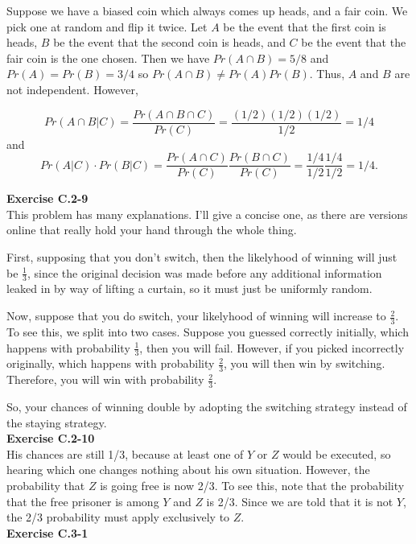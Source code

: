 \documentclass{article}
\begin{document}
Suppose we have a biased coin which always comes up heads, and a fair coin.  We pick one at random and flip it twice.  Let $A$ be the event that the first coin is heads, $B$ be the event that the second coin is heads, and $C$ be the event that the fair coin is the one chosen.  Then we have $Pr(A \cap B) = 5/8$ and $Pr(A) = Pr(B) = 3/4$ so $Pr(A \cap B) \neq Pr(A)Pr(B)$.  Thus, $A$ and $B$ are not independent.  However, 

\[ Pr(A \cap B | C) = \frac{Pr(A \cap B \cap C)}{Pr(C)} = \frac{(1/2)(1/2)(1/2)}{1/2} = 1/4\]
and
\[ Pr(A|C)\cdot Pr(B|C) = \frac{Pr(A \cap C)}{Pr(C)} \frac{Pr(B \cap C)}{Pr(C)} = \frac{1/4}{1/2} \frac{1/4}{1/2} = 1/4.\]

\noindent\textbf{Exercise C.2-9}\\

This problem has many explanations. I'll give a concise one, as there are versions online that really hold your hand through the whole thing.

First, supposing that you don't switch, then the likelyhood of winning will just be $\frac{1}{3}$, since the original decision was made before any additional information leaked in by way of lifting a curtain, so it must just be uniformly random.

Now, suppose that you do switch, your likelyhood of winning will increase to $\frac{2}{3}$. To see this, we split into two cases. Suppose you guessed correctly initially, which happens with probability $\frac{1}{3}$, then you will fail. However, if you picked incorrectly originally, which happens with probability $\frac{2}{3}$, you will then win by switching. Therefore, you will win with probability $\frac{2}{3}$.

So, your chances of winning double by adopting the switching strategy instead of the staying strategy.\\

\noindent\textbf{Exercise C.2-10}\\

His chances are still 1/3, because at least one of $Y$ or $Z$ would be executed, so hearing which one changes nothing about his own situation.  However, the probability that $Z$ is going free is now 2/3.  To see this, note that the probability that the free prisoner is among $Y$ and $Z$ is 2/3.  Since we are told that it is not $Y$, the 2/3 probability must apply exclusively to $Z$.  \\

\noindent\textbf{Exercise C.3-1}\\
\end{document}
